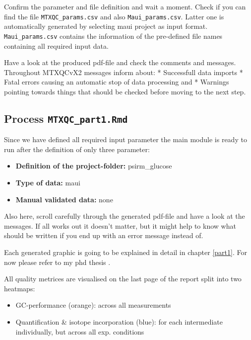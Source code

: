 \documentclass[]{book}
\providecommand{\tightlist}{%
  \setlength{\itemsep}{0pt}\setlength{\parskip}{0pt}}
\begin{document}
Confirm the parameter and file definition and wait a moment. Check if you can find the file \texttt{MTXQC\_params.csv} and also \texttt{Maui\_params.csv}. Latter one is automatically generated by selecting maui project as input format. \texttt{Maui\_params.csv} contains the information of the pre-defined file names containing all required input data.

Have a look at the produced pdf-file and check the comments and messages. Throughout MTXQCvX2 messages inform about:
* Successfull data imports
* Fatal errors causing an automatic stop of data processing and
* Warnings pointing towards things that should be checked before moving to the next step.

\hypertarget{process-mtxqc_part1.rmd}{%
\subsection{\texorpdfstring{Process \texttt{MTXQC\_part1.Rmd}}{Process MTXQC\_part1.Rmd}}\label{process-mtxqc_part1.rmd}}

Since we have defined all required input parameter the main module is ready to run after the definition of only three parameter:

\begin{itemize}
\tightlist
\item
  \textbf{Definition of the project-folder:} psirm\_glucose
\item
  \textbf{Type of data:} maui
\item
  \textbf{Manual validated data:} none
\end{itemize}

Also here, scroll carefully through the generated pdf-file and have a look at the messages. If all works out it doesn't matter, but it might help to know what should be written if you end up with an error message instead of.

Each generated graphic is going to be explained in detail in chapter \ref{part1}. For now please refer to my phd thesis \citep{Zasada2017}.

All quality metrices are visualised on the last page of the report split into two heatmaps:

\begin{itemize}
\tightlist
\item
  GC-performance (orange): across all measurements
\item
  Quantification \& isotope incorporation (blue): for each intermediate individually, but across all exp. conditions
\end{itemize}
\end{document}
